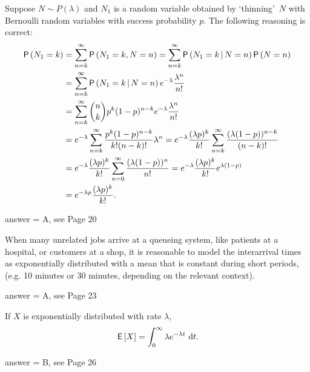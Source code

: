 \begin{exercise}[201802]
Suppose $N\sim P(\lambda)$ and $N_1$ is a random variable obtained by `thinning'~$N$ with Bernoulli random variables with success probability $p$. The following reasoning is correct:
\begin{equation*}
  \begin{split}
    \P{N_1 = k}
&= \sum_{n=k}^\infty \P{N_1 =k, N = n} 
= \sum_{n=k}^\infty \P{N_1 =k\given N = n}\P{N=n} \\
&= \sum_{n=k}^\infty \P{N_1 =k\given N = n}e^{-\lambda} \frac{\lambda^n}{n!}\\
&= \sum_{n=k}^\infty {n \choose k} p^k (1-p)^{n-k} e^{-\lambda} \frac{\lambda^n}{n!} \\
&= e^{-\lambda}\sum_{n=k}^\infty  \frac{p^k (1-p)^{n-k}}{k! (n-k)!} \lambda^n
= e^{-\lambda} \frac{(\lambda p)^k}{k!} \sum_{n=k}^\infty  \frac{(\lambda (1-p))^{n-k}}{(n-k)!}\\
&= e^{-\lambda} \frac{(\lambda p)^k}{k!} \sum_{n=0}^\infty  \frac{(\lambda (1-p))^{n}}{n!}
= e^{-\lambda} \frac{(\lambda p)^k}{k!} e^{\lambda(1-p)} \\
&= e^{-\lambda p} \frac{(\lambda p)^k}{k!}.
  \end{split}
\end{equation*}
\begin{solution}
answer = A, see Page 20
\end{solution}
\end{exercise}

\begin{exercise}[201802]
When many unrelated jobs arrive at a queueing system, like patients at a hospital, or customers at a shop, it is reasonable to model the interarrival times as exponentially distributed with a mean that is constant during short periods, (e.g. 10 minutes or 30 minutes, depending on the relevant context). 
\begin{solution}
answer = A, see Page 23
\end{solution}
\end{exercise}

\begin{exercise}[201802]
If $X$ is exponentially distributed with rate $\lambda$,
 \begin{equation*}
    \,\mathsf{E}\left[X\right] = \int_0^\infty \lambda e^{-\lambda t}\, \,\text{d}t.
  \end{equation*}
\begin{solution}
answer = B, see Page 26
\end{solution}
\end{exercise}

